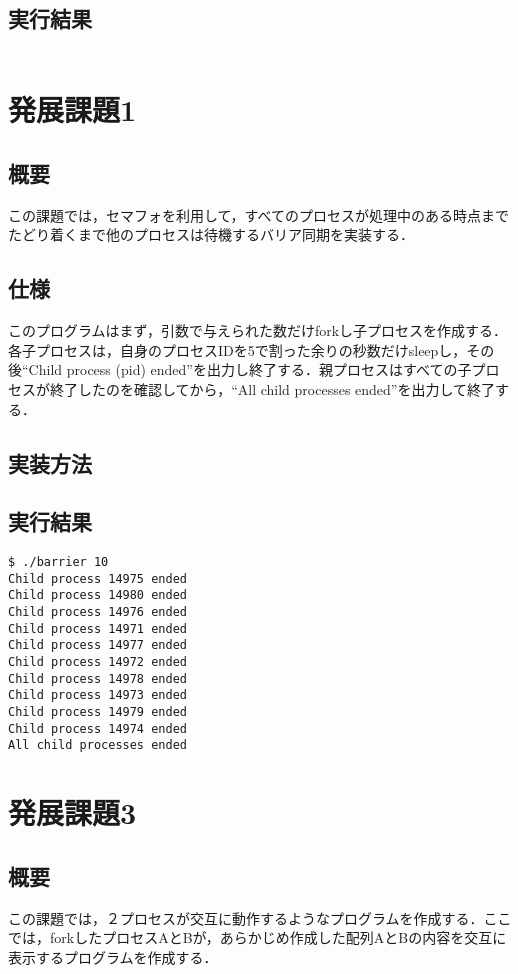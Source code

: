 \documentclass[a4j,10pt,titlepage]{jsarticle}
\begin{document}
\subsection{実行結果}
\begin{verbatim}

\end{verbatim}

\section{発展課題1}
\subsection{概要}
この課題では，セマフォを利用して，すべてのプロセスが処理中のある時点までたどり着くまで他のプロセスは待機するバリア同期を実装する．

\subsection{仕様}
このプログラムはまず，引数で与えられた数だけforkし子プロセスを作成する．各子プロセスは，自身のプロセスIDを5で割った余りの秒数だけsleepし，その後``Child process (pid) ended''を出力し終了する．親プロセスはすべての子プロセスが終了したのを確認してから，``All child processes ended''を出力して終了する．

\subsection{実装方法}

\subsection{実行結果}
\begin{verbatim}
$ ./barrier 10
Child process 14975 ended
Child process 14980 ended
Child process 14976 ended
Child process 14971 ended
Child process 14977 ended
Child process 14972 ended
Child process 14978 ended
Child process 14973 ended
Child process 14979 ended
Child process 14974 ended
All child processes ended
\end{verbatim}
\section{発展課題3}
\subsection{概要}
この課題では，２プロセスが交互に動作するようなプログラムを作成する．ここでは，forkしたプロセスAとBが，あらかじめ作成した配列AとBの内容を交互に表示するプログラムを作成する．
\end{document}
